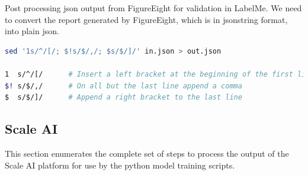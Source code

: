 \documentclass[11pt]{article} %
\begin{document}
Post processing json output from FigureEight for validation in LabelMe. We need 
to convert the report generated by FigureEight, which is in jsonstring format, 
into plain json. 

\begin{lstlisting}[language=bash, frame=single]
sed '1s/^/[/; $!s/$/,/; $s/$/]/' in.json > out.json

1  s/^/[/      # Insert a left bracket at the beginning of the first line
$! s/$/,/      # On all but the last line append a comma
$  s/$/]/      # Append a right bracket to the last line
\end{lstlisting}

\subsection{Scale AI}

This section enumerates the complete set of steps to process the output of the 
Scale AI platform for use by the python model training scripts.
\end{document}
